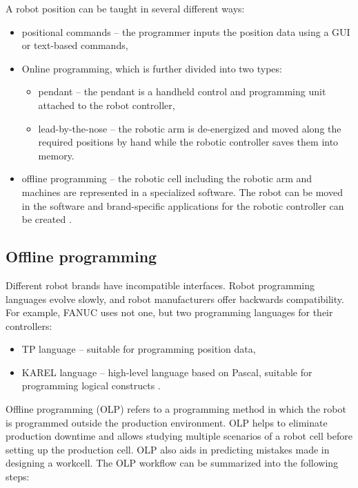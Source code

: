 A robot position can be taught in several different ways:

\begin{itemize}
    \item positional commands -- the programmer inputs the position data using a GUI or text-based commands,
    
    \item Online programming, which is further divided into two types:
    
    \begin{itemize}
    
    \item pendant -- the pendant is a handheld control and programming unit attached to the robot controller,
    \item lead-by-the-nose -- the robotic arm is de-energized and moved along the required positions by hand while the robotic controller saves them into memory.
    
    \end{itemize}
    
    \item offline programming -- the robotic cell including the robotic arm and machines are represented in a specialized software. The robot can be moved in the software and brand-specific applications for the robotic controller can be created \cite{robodkmethods}.
  

\end{itemize}

\subsection{Offline programming}
Different robot brands have incompatible interfaces. Robot programming languages evolve slowly, and robot manufacturers offer backwards compatibility. For example, FANUC uses not one, but two programming languages for their controllers: 

\begin{itemize}

 \item TP language -- suitable for programming position data,
 \item KAREL language -- high-level language based on Pascal, suitable for programming logical constructs \cite{fanuchandling}.

\end{itemize}

Offline programming  (OLP) refers to a programming method in which the robot is programmed outside the production environment. OLP helps to eliminate production downtime and allows studying multiple scenarios of a robot cell before setting up the production cell. OLP also aids in predicting mistakes made in designing a workcell. The OLP workflow can be summarized into the following steps:

